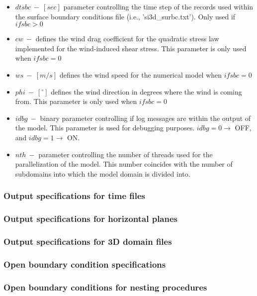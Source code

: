 \begin{itemize}
    \item $dtsbc\ -\ [sec]$ parameter controlling the time step of the records used within the surface boundary conditions file (i.e., 'si3d\_surbc.txt'). Only used if $ifsbc > 0$
    \item $cw\ -$ defines the wind drag coefficient for the quadratic stress law implemented for the wind-induced shear stress. This parameter is only used when $ifsbc = 0$
    \item $ws\ -\ [m/s]$ defines the wind speed for the numerical model when $ifsbc = 0$
    \item $phi\ -\ [^{\circ}]$ defines the wind direction in degrees where the wind is coming from. This parameter is only used when $ifsbc = 0$
    \item $idbg\ -$ binary parameter controlling if log messages are within the output of the model. This parameter is used for debugging purposes. $idbg = 0 \rightarrow$ OFF, and $idbg = 1 \rightarrow$ ON.
    \item $nth\ -$ parameter controlling the number of threads used for the parallelization of the model. This number coincides with the number of subdomains into which the model domain is divided into.
\end{itemize}

\subsubsection{Output specifications for time files}

\subsubsection{Output specifications for horizontal planes}

\subsubsection{Output specifications for 3D domain files}

\subsubsection{Open boundary condition specifications}

\subsubsection{Open boundary conditions for nesting procedures}

